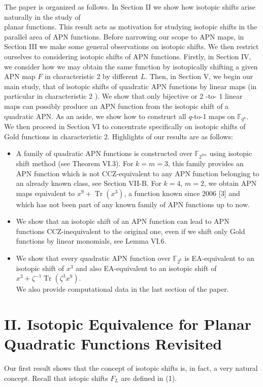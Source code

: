 \documentclass[10pt]{article}
\begin{document}
The paper is organized as follows. In Section II we show how isotopic shifts arise naturally in the study of\\
planar functions. This result acts as motivation for studying isotopic shifts in the parallel area of APN functions. Before narrowing our scope to APN maps, in Section III we make some general observations on isotopic shifts. We then restrict ourselves to considering isotopic shifts of APN functions. Firstly, in Section IV, we consider how we may obtain the same function by isotopically shifting a given APN map $F$ in characteristic 2 by different $L$. Then, in Section V, we begin our main study, that of isotopic shifts of quadratic APN functions by linear maps (in particular in characteristic 2 ). We show that only bijective or 2 -to- 1 linear maps can possibly produce an APN function from the isotopic shift of a quadratic APN. As an aside, we show how to construct all $q$-to-1 maps on $\mathbb{F}_{q^{n}}$. We then proceed in Section VI to concentrate specifically on isotopic shifts of Gold functions in characteristic 2. Highlights of our results are as follows:

\begin{itemize}
  \item A family of quadratic APN functions is constructed over $\mathbb{F}_{2^{k m}}$ using isotopic shift method (see Theorem VI.3). For $k=m=3$, this family provides an APN function which is not CCZ-equivalent to any APN function belonging to an already known class, see Section VII-B. For $k=4$, $m=2$, we obtain APN maps equivalent to $x^{9}+\operatorname{Tr}\left(x^{3}\right)$, a function known since 2006 [3] and which has not been part of any known family of APN functions up to now.
  \item We show that an isotopic shift of an APN function can lead to APN functions CCZ-inequivalent to the original one, even if we shift only Gold functions by linear monomials, see Lemma VI.6.
  \item We show that every quadratic APN function over $\mathbb{F}_{2^{6}}$ is EA-equivalent to an isotopic shift of $x^{3}$ and also EA-equivalent to an isotopic shift of $x^{3}+\zeta^{-1} \operatorname{Tr}\left(\zeta^{3} x^{9}\right)$.\\
We also provide computational data in the last section of the paper.
\end{itemize}

\section*{II. Isotopic Equivalence for Planar Quadratic Functions Revisited}
Our first result shows that the concept of isotopic shifts is, in fact, a very natural concept. Recall that istopic shifts $F_{L}$ are defined in (1).
\end{document}

